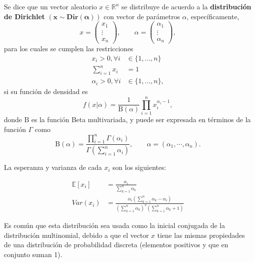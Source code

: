 \begin{defin}
    Se dice que un vector aleatorio $x \in \mathbb{R}^n$ se distribuye de acuerdo a la \textbf{distribuci\'on de Dirichlet}  $\mathbf{(x \sim Dir(\alpha))}$ con vector de par\'ametros $\alpha$, espec\'ificamente,
    \begin{equation*}
        x = 
        \left(\begin{array}{c}
            x_1  \\
            \vdots \\
            x_n
        \end{array}\right),
        \qquad
        \alpha = 
        \left(\begin{array}{c}
            \alpha_1  \\
            \vdots \\
            \alpha_n
        \end{array}\right),
    \end{equation*}
    para los cuales se cumplen las restricciones
    \begin{equation*}
    \begin{aligned}
        x_i > 0, \forall i &\in \{1,...,n\} \\
        \sum_{i=1}^n x_i &= 1 \\
        \alpha_i > 0, \forall i &\in \{1,...,n\},
    \end{aligned}
    \end{equation*}
    si su funci\'on de densidad  es
    \begin{equation*}
        f(x|\alpha) = 
        \frac {1}{\mathrm {B} (\alpha)}
        \prod _{i=1}^{n}x_{i}^{\alpha _{i}-1},
    \end{equation*}
    donde $\mathrm{B}$ es la funci\'on Beta multivariada, y puede ser expresada en t\'erminos de la funci\'on $\Gamma$ como 
    \begin{equation*}
       \mathrm{B}(\alpha)=
       \frac {\prod _{i=1}^{n}\Gamma (\alpha _{i})}
       {\Gamma \left(\sum _{i=1}^{n}\alpha _{i}\right)},
       \qquad 
       \alpha =(\alpha _1,\cdots ,\alpha _n). 
    \end{equation*}
    
    La esperanza y varianza de cada $x_i$ son los siguientes:
    
    \begin{equation*}
    \begin{aligned}
        \mathbb{E}[x_i] &= \frac{\alpha_i}{\sum_{k=1}^n \alpha_k} \\
        Var(x_i) &= \frac
        {\alpha_i \left( \sum_{k=1}^n \alpha_k - \alpha_i \right)}
        {\left( \sum_{k=1}^n \alpha_k \right)^2 \left( \sum_{k=1}^n \alpha_k + 1 \right)}
    \end{aligned}
    \end{equation*}
    
\end{defin}

Es com\'un que esta distribuci\'on sea usada como la inicial conjugada de la distribuci\'on multinomial, debido a que el vector $x$ tiene las mismas propiedades de una distribuci\'on de probabilidad discreta (elementos positivos y que en conjunto suman 1).